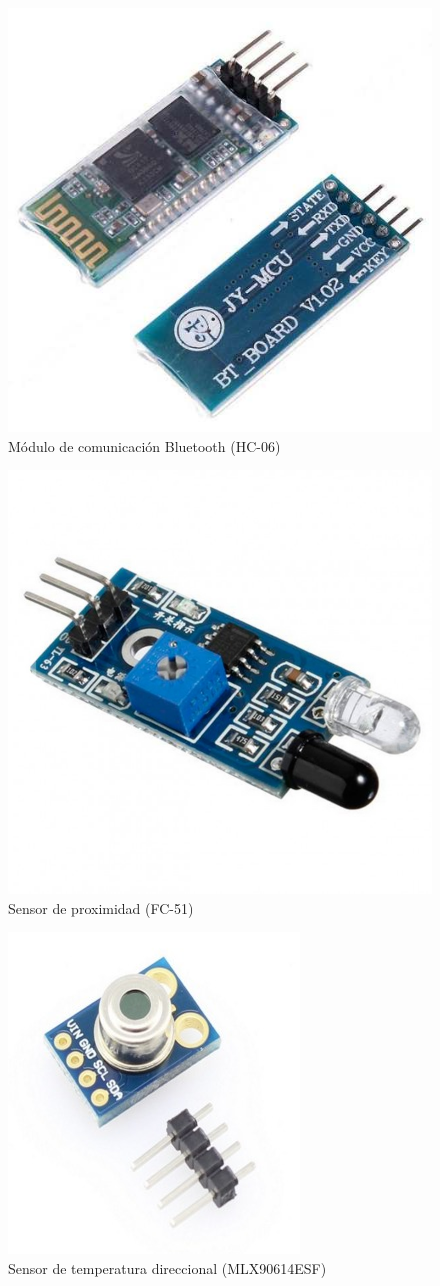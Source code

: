 \documentclass{IEEEtran}
\begin{document}
			\begin{figure}
				\centering
				\includegraphics[width=0.5\linewidth]{arduino-modulo-bluetooth}
				\caption{Módulo de comunicación Bluetooth (HC-06)}
				\label{arduino-modulo-bluetooth}
			\end{figure}

			\begin{figure}
				\centering
				\includegraphics[width=0.5\linewidth]{arduino-modulo-proximidad}
				\caption{Sensor de proximidad (FC-51)}
				\label{arduino-modulo-proximidad}
			\end{figure}

			\begin{figure}
				\centering
				\includegraphics[width=0.5\linewidth]{arduino-modulo-temperatura}
				\caption{Sensor de temperatura direccional (MLX90614ESF)}
				\label{arduino-modulo-temperatura}
			\end{figure}
\end{document}
